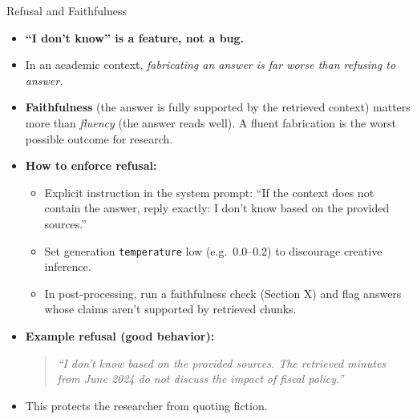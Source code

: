 \begin{frame}{Refusal and Faithfulness}
\begin{itemize}
\item \textbf{``I don't know'' is a feature, not a bug.}

\medskip
\item In an academic context, \emph{fabricating an answer is far worse than refusing to answer.}

\medskip
\item \textbf{Faithfulness} (the answer is fully supported by the retrieved context) matters more than \emph{fluency} (the answer reads well). A fluent fabrication is the worst possible outcome for research.

\medskip
\item \textbf{How to enforce refusal:}
\begin{itemize}
    \item Explicit instruction in the system prompt: ``If the context does not contain the answer, reply exactly: I don't know based on the provided sources.''
    \item Set generation \texttt{temperature} low (e.g.\ 0.0--0.2) to discourage creative inference.
    \item In post-processing, run a faithfulness check (Section X) and flag answers whose claims aren't supported by retrieved chunks.
\end{itemize}

\medskip
\item \textbf{Example refusal (good behavior):}
\begin{quote}
\small\itshape
``I don't know based on the provided sources. The retrieved minutes from June 2024 do not discuss the impact of fiscal policy.''
\end{quote}

\medskip
\item This protects the researcher from quoting fiction.
\end{itemize}
\end{frame}

